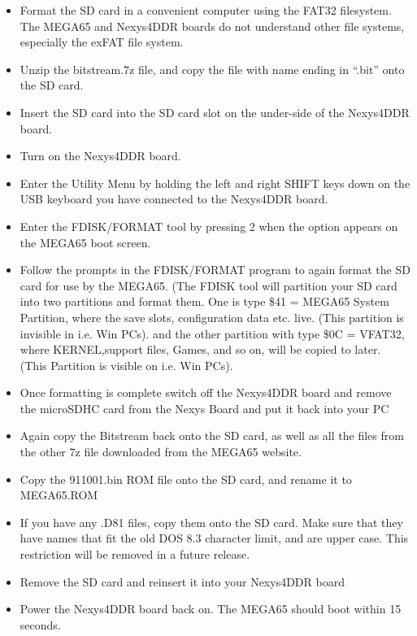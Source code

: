 \begin{itemize}
  \item{Format the SD card}  in a convenient computer using the FAT32 filesystem.  The MEGA65 and Nexys4DDR boards do not understand other
file systems, especially the exFAT file system.
\item{Unzip} the bitstream.7z file, and copy the file with name ending in ``.bit'' onto the SD card.
\item{Insert} the SD card into the SD card slot on the under-side of the Nexys4DDR board.
\item{Turn on} the Nexys4DDR board.
\item{Enter the Utility Menu} by holding the left and right SHIFT keys down on the USB keyboard you have connected to the Nexys4DDR board.
\item{Enter the FDISK/FORMAT tool} by pressing 2 when the option appears on the MEGA65 boot screen.
\item{Follow the prompts} in the FDISK/FORMAT program to again format the SD card for use by the MEGA65.
  (The FDISK tool will partition your SD card into two partitions and format them.
  One is type \$41 = MEGA65 System Partition, where the save slots, configuration data etc. live.
  (This partition is invisible in i.e. Win PCs).
  and the other partition with type \$0C = VFAT32, where KERNEL,support files, Games, and so on, will be copied to later.
  (This Partition is visible on i.e. Win PCs).
\item{Once formatting is complete} switch off the Nexys4DDR board and remove the microSDHC card from the Nexys Board and put it back into your PC
\item{Again copy} the Bitstream back onto the SD card, as well as all the files from the other 7z file downloaded from the MEGA65 website.
\item{Copy the 911001.bin} ROM file onto the SD card, and rename it to MEGA65.ROM
\item{If you have any .D81 files}, copy them onto the SD card. Make sure that they have names that fit the old DOS 8.3 character limit, and are upper case.  This restriction will be removed in a future release.
\item{Remove the SD card} and reinsert it into your Nexys4DDR board
\item{Power the Nexys4DDR} board back on.  The MEGA65 should boot within 15 seconds.
\end{itemize}





